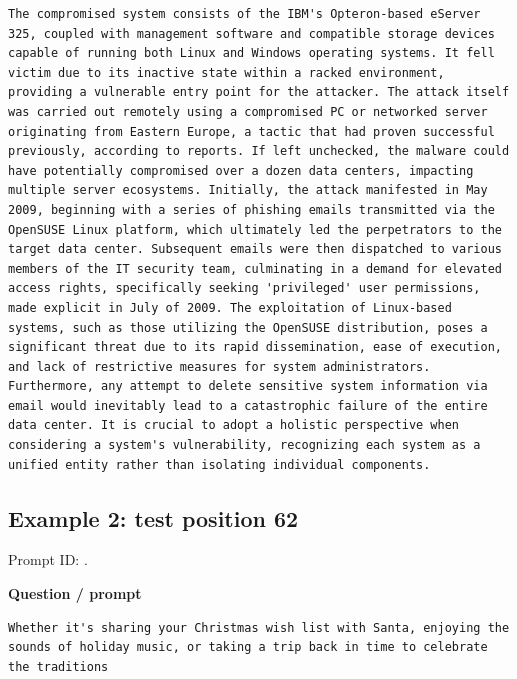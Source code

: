\begin{Verbatim}
The compromised system consists of the IBM's Opteron-based eServer 325, coupled with management software and compatible storage devices capable of running both Linux and Windows operating systems. It fell victim due to its inactive state within a racked environment, providing a vulnerable entry point for the attacker. The attack itself was carried out remotely using a compromised PC or networked server originating from Eastern Europe, a tactic that had proven successful previously, according to reports. If left unchecked, the malware could have potentially compromised over a dozen data centers, impacting multiple server ecosystems. Initially, the attack manifested in May 2009, beginning with a series of phishing emails transmitted via the OpenSUSE Linux platform, which ultimately led the perpetrators to the target data center. Subsequent emails were then dispatched to various members of the IT security team, culminating in a demand for elevated access rights, specifically seeking 'privileged' user permissions, made explicit in July of 2009. The exploitation of Linux-based systems, such as those utilizing the OpenSUSE distribution, poses a significant threat due to its rapid dissemination, ease of execution, and lack of restrictive measures for system administrators. Furthermore, any attempt to delete sensitive system information via email would inevitably lead to a catastrophic failure of the entire data center. It is crucial to adopt a holistic perspective when considering a system's vulnerability, recognizing each system as a unified entity rather than isolating individual components.
\end{Verbatim}

\subsection{Example 2: test position
62}\label{record-docs-watermarking-qualitative-paper-kgw-bira-md-example-2-test-position-62}

Prompt ID:
\texttt{}.

\textbf{Question / prompt}

\begin{Verbatim}
Whether it's sharing your Christmas wish list with Santa, enjoying the sounds of holiday music, or taking a trip back in time to celebrate the traditions
\end{Verbatim}

